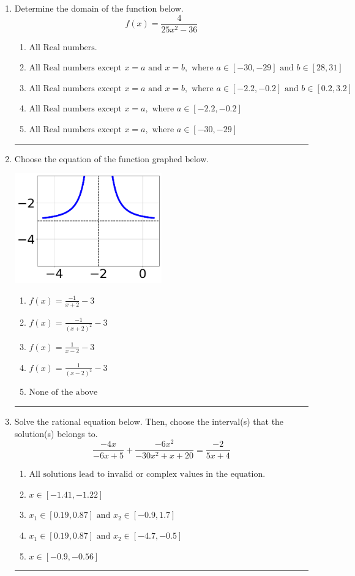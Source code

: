 \documentclass[14pt]{extbook}
\newcommand{\litem}[1]{\item#1\hspace*{-1cm}\rule{\textwidth}{0.4pt}}
\begin{document}
\begin{enumerate}
\litem{
Determine the domain of the function below.\[ f(x) = \frac{4}{25x^{2} -36} \]\begin{enumerate}[label=\Alph*.]
\item \( \text{All Real numbers.} \)
\item \( \text{All Real numbers except } x = a \text{ and } x = b, \text{ where } a \in [-30, -29] \text{ and } b \in [28, 31] \)
\item \( \text{All Real numbers except } x = a \text{ and } x = b, \text{ where } a \in [-2.2, -0.2] \text{ and } b \in [0.2, 3.2] \)
\item \( \text{All Real numbers except } x = a, \text{ where } a \in [-2.2, -0.2] \)
\item \( \text{All Real numbers except } x = a, \text{ where } a \in [-30, -29] \)

\end{enumerate} }
\litem{
Choose the equation of the function graphed below.
\begin{center}
    \includegraphics[width=0.5\textwidth]{../Figures/rationalGraphToEquationB.png}
\end{center}
\begin{enumerate}[label=\Alph*.]
\item \( f(x) = \frac{-1}{x + 2} - 3 \)
\item \( f(x) = \frac{-1}{(x + 2)^2} - 3 \)
\item \( f(x) = \frac{1}{x - 2} - 3 \)
\item \( f(x) = \frac{1}{(x - 2)^2} - 3 \)
\item \( \text{None of the above} \)

\end{enumerate} }
\litem{
Solve the rational equation below. Then, choose the interval(s) that the solution(s) belongs to.\[ \frac{-4x}{-6x + 5} + \frac{-6x^{2}}{-30x^{2} +x + 20} = \frac{-2}{5x + 4} \]\begin{enumerate}[label=\Alph*.]
\item \( \text{All solutions lead to invalid or complex values in the equation.} \)
\item \( x \in [-1.41,-1.22] \)
\item \( x_1 \in [0.19, 0.87] \text{ and } x_2 \in [-0.9,1.7] \)
\item \( x_1 \in [0.19, 0.87] \text{ and } x_2 \in [-4.7,-0.5] \)
\item \( x \in [-0.9,-0.56] \)


\end{enumerate}}
\end{enumerate}
\end{document}
